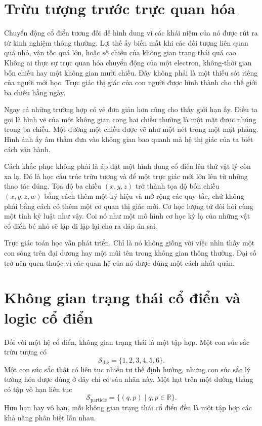 \section{Trừu tượng trước trực quan hóa}

Chuyển động cổ điển tương đối dễ hình dung vì các khái niệm của nó được rút ra từ kinh nghiệm thông thường. Lợi thế ấy biến mất khi các đối tượng liên quan quá nhỏ, vận tốc quá lớn, hoặc số chiều của không gian trạng thái quá cao. Không ai thực sự trực quan hóa chuyển động của một electron, không-thời gian bốn chiều hay một không gian mười chiều. Đây không phải là một thiếu sót riêng của người mới học. Trực giác thị giác của con người được hình thành cho thế giới ba chiều hằng ngày.

Ngay cả những trường hợp có vẻ đơn giản hơn cũng cho thấy giới hạn ấy. Điều ta gọi là hình vẽ của một không gian cong hai chiều thường là một mặt được nhúng trong ba chiều. Một đường một chiều được vẽ như một nét trong một mặt phẳng. Hình ảnh ấy âm thầm đưa vào không gian bao quanh mà hệ thị giác của ta biết cách vận hành.

Cách khắc phục không phải là áp đặt một hình dung cổ điển lên thứ vật lý còn xa lạ. Đó là học cấu trúc trừu tượng và để một trực giác mới lớn lên từ những thao tác đúng. Tọa độ ba chiều \((x,y,z)\) trở thành tọa độ bốn chiều \((x,y,z,w)\) bằng cách thêm một ký hiệu và mở rộng các quy tắc, chứ không phải bằng cách có thêm một cơ quan thị giác mới. Cơ học lượng tử đòi hỏi cùng một tính kỷ luật như vậy. Coi nó như một mô hình cơ học kỳ lạ của những vật cổ điển bé nhỏ sẽ lặp đi lặp lại cho ra đáp án sai.

\begin{remark}Trực giác toán học vẫn phát triển. Chỉ là nó không giống với việc nhìn thấy một con sóng trên đại dương hay một mũi tên trong không gian thông thường. Đại số trở nên quen thuộc vì các quan hệ của nó được dùng một cách nhất quán.
\end{remark}

\section{Không gian trạng thái cổ điển và logic cổ điển}

Đối với một hệ cổ điển, không gian trạng thái là một tập hợp. Một con súc sắc trừu tượng có
\begin{equation}
  \mathcal S_{\mathrm{die}}=\{1,2,3,4,5,6\}.
\end{equation}
Một con súc sắc thật có liên tục nhiều tư thế định hướng, nhưng con súc sắc lý tưởng hóa được dùng ở đây chỉ có sáu nhãn này. Một hạt trên một đường thẳng có tập vô hạn liên tục
\begin{equation}
  \mathcal S_{\mathrm{particle}}
  =
  \{(q,p)\mid q,p\in\mathbb R\}.
\end{equation}
Hữu hạn hay vô hạn, mỗi không gian trạng thái cổ điển đều là một tập hợp các khả năng phân biệt lẫn nhau.

